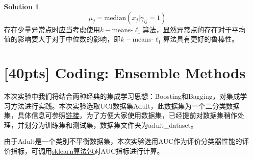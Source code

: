 \documentclass[a4paper,UTF8]{article}
\theoremstyle{definition}
\newtheorem*{solution}{Solution}
\begin{document}
\begin{solution}
$$\mu_{j}=\text{median}(x_j|\gamma_{i j}=1)$$
存在少量异常点时应当考虑使用$k-$means-$\ell_1$算法，显然异常点的存在对于平均值的影响要大于对于中位数的影响，即$k-$means-$\ell_1$算法具有更好的鲁棒性。
\end{solution}

\section{[40pts] Coding: Ensemble Methods }

本次实验中我们将结合两种经典的集成学习思想：Boosting和Bagging，对集成学习方法进行实践。本次实验选取UCI数据集Adult，此数据集为一个二分类数据集，具体信息可参照\href{http://archive.ics.uci.edu/ml/datasets/Adult}{链接}，为了方便大家使用数据集，已经提前对数据集稍作处理，并划分为训练集和测试集，数据集文件夹为adult\_dataset。

由于Adult是一个类别不平衡数据集，本次实验选用AUC作为评价分类器性能的评价指标，可调用\href{http://scikit-learn.org/stable/modules/generated/sklearn.metrics.roc_auc_score.html}{sklearn算法包}对AUC指标进行计算。
\end{document}
